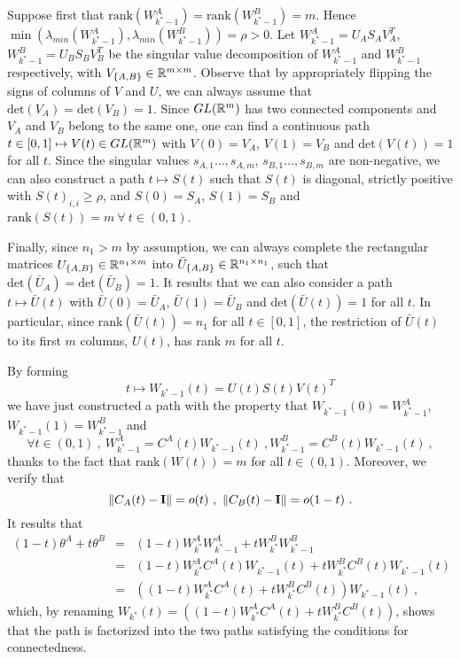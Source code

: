 Suppose first that $\text{rank}(W_{k^*-1}^A) = \text{rank}(W_{k^*-1}^B) =m$. Hence $\min( \lambda_{min}(W_{k^*-1}^A),\lambda_{min}(W_{k^*-1}^B)) = \rho > 0 $.
Let $W_{k^*-1}^A = U_A S_A V_A^T$,  $W_{k^*-1}^B = U_B S_B V_B^T$ be the singular value decomposition of 
$W_{k^*-1}^A$ and $W_{k^*-1}^B$ respectively, with $V_{\{A,B\}} \in {\mathbb{R}}^{m \times m}$. Observe that by appropriately 
flipping the signs of columns of $V$ and $U$, we can always assume that $\text{det}(V_A) = \text{det}(V_B) =1$. 
Since $GL({\mathbb{R}}^m)$ has two connected components and $V_A$ and $V_B$ belong to the same one, one can find 
a continuous path $t\in [0,1] \mapsto V(t) \in GL({\mathbb{R}}^m)$ with $V(0) = V_A$, $V(1) = V_B$ and $\text{det}(V(t)) = 1$ for all $t$. 
Since the singular values $s_{A,1} \dots, s_{A,m}$, $s_{B,1} \dots, s_{B,m}$ are non-negative, we can also construct a 
path $t \mapsto S(t)$ such that $S(t)$ is diagonal, strictly positive with $S(t)_{i,i} \geq \rho$, and $S(0)=S_A$, $S(1)=S_B$ and $\text{rank}(S(t)) = m~\forall~t\in(0,1)$. 

Finally, since $n_1 > m$ by assumption, we can always complete the rectangular matrices $U_{\{A,B\}} \in {\mathbb{R}}^{n_1 \times m}$ into
$\bar{U}_{\{A,B\}} \in {\mathbb{R}}^{n_1 \times n_1}$, such that $\text{det}(\bar{U}_A) = \text{det}(\bar{U}_B) = 1$. It results that we can also 
consider a path $t \mapsto \bar{U}(t)$ with $\bar{U}(0) = \bar{U}_A$, $\bar{U}(1) = \bar{U}_B$ and $\text{det}(\bar{U}(t)) = 1$ for all $t$. 
In particular, since $\text{rank}(\bar{U}(t)) = n_1$ for all $t\in[0,1]$, the restriction of $\bar{U}(t)$ to its first $m$ columns, $U(t)$, has rank $m$ for all $t$. 

By forming 
$$t \mapsto W_{k^*-1}(t)=U(t) S(t) V(t)^T$$
we have just constructed a path with the property that $W_{k^*-1}(0) = W_{k^*-1}^A$, $W_{k^*-1}(1) = W_{k^*-1}^B$ and 
$$\forall t \in (0,1)~,~ W_{k^*-1}^{A} = C^A(t) W_{k^*-1}(t)~,W_{k^*-1}^B = C^B(t) W_{k^*-1}(t)~,$$
thanks to the fact that $\text{rank}(W(t)) = m$ for all $t \in (0,1)$. 
Moreover, we verify that 
$$\| C_A(t) - {\bf I} \| = o(t)~,~ \| C_B(t) - {\bf I} \| = o(1-t)~.$$
It results that
\begin{eqnarray*}
(1-t) \theta^A + t \theta^B &=& (1-t) W_{k^*}^A W_{k^*-1}^A+ t W_{k^*}^B W_{k^*-1}^B \\
 &=& (1-t) W_{k^*}^A C^A(t) W_{k^*-1}(t) + t W_{k^*}^B C^B(t) W_{k^*-1}(t) \\
  &=&  \left((1-t) W_{k^*}^A C^A(t) + t W_{k^*}^B C^B(t) \right) W_{k^*-1}(t)~,
\end{eqnarray*}
which, by renaming $W_{k^*}(t) =  \left((1-t) W_{k^*}^A C^A(t) + t W_{k^*}^B C^B(t) \right)$, 
shows that the path is factorized into the two paths 
satisfying the conditions for connectedness. 


